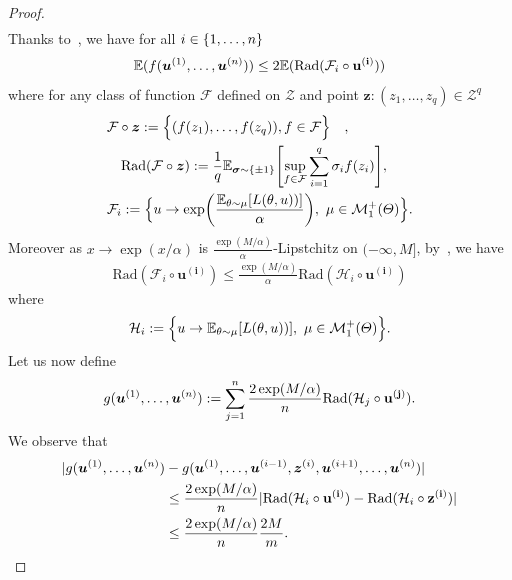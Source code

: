 \begin{proof}
\begin{align*}
\end{align*}
Thanks to~\citep[Lemma 26.2]{shalev2014understanding}, we have for all $i\in\{1,\dots,n\}$
\begin{align*}
\mathbb{E}(f(\bm{u}^{(1)},\dots,\bm{u}^{(n)}))\leq 2 \mathbb{E}(\text{Rad}(\mathcal{F}_i\circ \mathbf{u^{(i)}}))    
\end{align*}
where for any class of function $\mathcal{F}$ defined on $\mathcal{Z}$  and point $\bm{z}:(z_1,\dots,z_q)\in\mathcal{Z}^q$
\begin{align*}
    &\mathcal{F}\circ \bm{z}:=\Big\{(f(z_1),\dots,f(z_q)),f\in\mathcal{F}\Big\} \quad,\\
    &\quad \text{Rad}(\mathcal{F}\circ \bm{z}):=\frac{1}{q}\mathbb{E}_{\bm{\sigma}\sim\{\pm 1\}}\left[\sup_{f\in\mathcal{F}}\sum_{i=1}^q\sigma_if(z_i)\right],\\
    &\mathcal{F}_i:=\Big\{u\rightarrow\exp\left(\frac{\mathbb{E}_{\theta \sim \mu}\left[\loss(\theta,u))\right]}{\alpha}\right),~\mu\in\mathcal{M}_{1}^{+}(\Theta) \Big\}.
      \end{align*}
Moreover as $x\rightarrow\exp(x/\alpha)$ is $\frac{\exp(M/\alpha)}{\alpha}$-Lipstchitz on $(-\infty,M]$, by~\citep[Lemma 26.9]{shalev2014understanding}, we have 
\begin{align*}
   \text{Rad}(\mathcal{F}_i\circ \mathbf{u^{(i)}})\leq \frac{\exp(M/\alpha)}{\alpha} \text{Rad}(\mathcal{H}_i\circ \mathbf{u^{(i)}}) 
\end{align*}
where 
\begin{align*}
    \mathcal{H}_i:=\Big\{u\rightarrow \mathbb{E}_{\theta \sim \mu}\left[\loss(\theta,u))\right],~\mu\in\mathcal{M}_{1}^{+}(\Theta) \Big\}.
\end{align*}
Let us now define
\begin{align*}
    g(\bm{u}^{(1)},\dots,\bm{u}^{(n)}):=\sum_{j=1}^n\frac{2\exp(M/\alpha)}{n}\text{Rad}(\mathcal{H}_j\circ \mathbf{u^{(j)}}).
\end{align*}
We observe that 
\begin{align*}
|g(\bm{u}^{(1)},\dots,\bm{u}^{(n)}) &- g(\bm{u}^{(1)},\dots,\bm{u}^{(i-1)},\bm{z}^{(i)},\bm{u}^{(i+1)},\dots,\bm{u}^{(n)})|\\
&\leq \frac{2\exp(M/\alpha)}{n}|\text{Rad}(\mathcal{H}_i\circ \mathbf{u^{(i)}}) - \text{Rad}(\mathcal{H}_i\circ \mathbf{z^{(i)}})|\\
&\leq \frac{2\exp(M/\alpha)}{n}\frac{2M}{m}.
\end{align*}

\end{proof}

